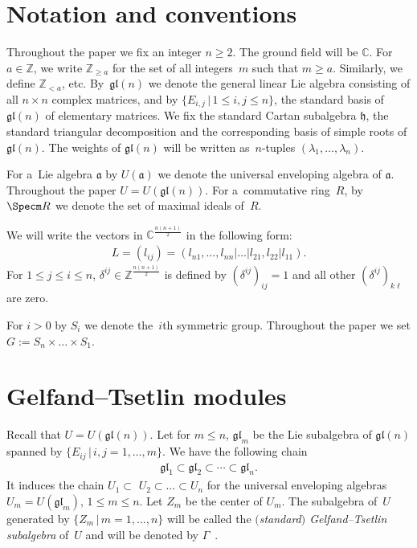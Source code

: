 \documentclass[pdftex]{sigma}
\numberwithin{equation}{section}
\begin{document}
\section{Notation and conventions}

Throughout the paper we f\/ix an integer $n\geq 2$.
The ground f\/ield will be ${\mathbb C}$.
For $a \in {\mathbb Z}$, we write $\mathbb Z_{\geq a}$ for the set of all integers~$m$ such that $m \geq a$.
Similarly, we def\/ine $\mathbb Z_{< a}$, etc.
By~$\mathfrak{gl}(n)$ we denote the general linear Lie algebra consisting
of all $n\times n$ complex matrices, and by $\{E_{i,j}\,|\, 1\leq i,j \leq n\}$,
the standard basis of $\mathfrak{gl}(n)$ of elementary matrices.
We f\/ix the standard Cartan subalgebra $\mathfrak h$, the standard triangular decomposition and the corresponding basis
of simple roots of $\mathfrak{gl}(n)$.
The weights of $\mathfrak{gl}(n)$ will be written as~$n$-tuples $(\lambda_1,\dots,\lambda_n)$.

For a~Lie algebra ${\mathfrak a}$ by $U(\mathfrak a)$ we denote the universal enveloping algebra of ${\mathfrak a}$.
Throughout the paper $U = U(\mathfrak{gl} (n))$.
For a~commutative ring~$R$, by $\Specm R$ we denote the set of maximal ideals of~$R$.

We will write the vectors in $\mathbb{C}^{\frac{n(n+1)}{2}}$ in the following form:
\begin{gather*}
L=(l_{ij})=(l_{n1},\dots,l_{nn}| \dots|l_{21}, l_{22}|l_{11}).
\end{gather*}
For $1\leq j \leq i \leq n$, $\delta^{ij} \in {\mathbb Z}^{\frac{n(n+1)}{2}}$ is def\/ined by $(\delta^{ij})_{ij}=1$ and
all other $(\delta^{ij})_{k\ell}$ are zero.

For $i>0$ by $S_i$ we denote the~$i$th symmetric group.
Throughout the paper we set $G:=S_n\times\dots \times S_1$.

\section{Gelfand--Tsetlin modules}
\label{section3}

Recall that $U=U(\mathfrak{gl} (n))$.
Let for $m\leqslant n$, $\mathfrak{gl}_{m}$ be the Lie subalgebra of $\mathfrak{gl} (n)$ spanned by $\{E_{ij} \,|\,
i,j=1,\ldots,m \}$.
We have the following chain
\begin{gather*}
\mathfrak{gl}_1\subset \mathfrak{gl}_2\subset \cdots \subset \mathfrak{gl}_n.
\end{gather*}
It induces the chain $U_1\subset$ $U_2\subset \dots \subset U_n$ for the universal enveloping algebras
$U_{m}=U(\mathfrak{gl}_{m})$, $1\leq m\leq n$.
Let $Z_{m}$ be the center of $U_{m}$.
The subalgebra of~$U$ generated by $\{Z_m \,|\, m=1,\ldots, n \}$ will be called the \emph{$($standard$)$ Gelfand--Tsetlin
subalgebra} of~$U$ and will be denoted by ${{\Gamma}}$~\cite{DFO3}.
\end{document}
